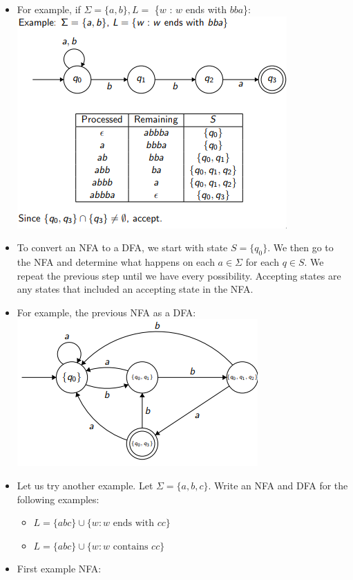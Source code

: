 \documentclass[12pt]{article}
\begin{document}
\begin{itemize}
    \newpage
    \item For example, if $\Sigma = \{a, b\}, L = $ \{$w$ : $w$ ends with $bba$\}: \\
        \includegraphics[scale=0.8]{abbba.png}
    \item To convert an NFA to a DFA, we start with state $S = \{q_0\}$.  We then go to the NFA and determine what happens on each $a \in \Sigma$ for each $q \in S$.  We repeat the previous step until we have every possibility.  Accepting states are any states that included an accepting state in the NFA.
    \item For example, the previous NFA as a DFA: \\
        \includegraphics[scale=0.8]{nfa_as_dfa.png}
    \item Let us try another example.  Let $\Sigma = \{a, b, c\}$.  Write an NFA and DFA for the following examples:
        \begin{itemize}
            \item $L = \{abc\} \cup \{w : w \text{ ends with } cc\}$
            \item $L = \{abc\} \cup \{w : w \text{ contains } cc\}$
        \end{itemize}
    \item First example NFA: \\

\end{itemize}
\end{document}

